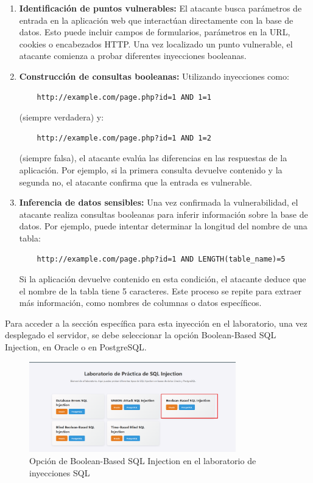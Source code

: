 \documentclass[a4paper,12pt]{article}
\begin{document}
\begin{enumerate}
    \item \textbf{Identificación de puntos vulnerables:} El atacante busca parámetros de entrada en la aplicación web que interactúan directamente con la base de datos. Esto puede incluir campos de formularios, parámetros en la URL, cookies o encabezados HTTP. Una vez localizado un punto vulnerable, el atacante comienza a probar diferentes inyecciones booleanas.

    \item \textbf{Construcción de consultas booleanas:} Utilizando inyecciones como:
    \begin{verbatim}
    http://example.com/page.php?id=1 AND 1=1
    \end{verbatim}
    (siempre verdadera) y:
    \begin{verbatim}
    http://example.com/page.php?id=1 AND 1=2
    \end{verbatim}
    (siempre falsa), el atacante evalúa las diferencias en las respuestas de la aplicación. Por ejemplo, si la primera consulta devuelve contenido y la segunda no, el atacante confirma que la entrada es vulnerable.

    \item \textbf{Inferencia de datos sensibles:} Una vez confirmada la vulnerabilidad, el atacante realiza consultas booleanas para inferir información sobre la base de datos. Por ejemplo, puede intentar determinar la longitud del nombre de una tabla:
    \begin{verbatim}
    http://example.com/page.php?id=1 AND LENGTH(table_name)=5
    \end{verbatim}
    Si la aplicación devuelve contenido en esta condición, el atacante deduce que el nombre de la tabla tiene 5 caracteres. Este proceso se repite para extraer más información, como nombres de columnas o datos específicos.

\end{enumerate}

Para acceder a la sección específica para esta inyección en el laboratorio, una vez desplegado el servidor, se debe seleccionar la opción Boolean-Based SQL Injection, en Oracle o en PostgreSQL.

\begin{figure}[H]
    \centering
    \includegraphics[width=0.8\textwidth]{Imagenes/BooleanSQLIMenu.png}
    \caption{Opción de Boolean-Based SQL Injection en el laboratorio de inyecciones SQL}
\end{figure}
\end{document}
